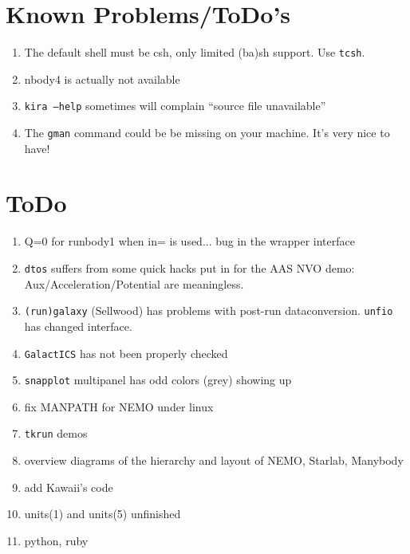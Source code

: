\section{Known Problems/ToDo's}
\begin{enumerate}

\item
The default shell must be csh, only limited (ba)sh support. Use {\tt tcsh}.

\item
nbody4 is actually not available

\item
{\tt kira --help} sometimes will complain ``source file unavailable''

\item
The {\tt gman} command could be be missing on your machine. It's very nice to have!

\end{enumerate}

\section{ToDo}
\begin{enumerate}

\item
Q=0 for runbody1 when in= is used...   bug in the wrapper interface

\item
{\tt dtos} suffers from some quick hacks put in for the AAS NVO demo:
Aux/Acceleration/Potential are meaningless.

\item
{\tt (run)galaxy} (Sellwood) has problems with post-run dataconversion. 
{\tt unfio} has changed interface.

\item
{\tt GalactICS} has not been properly checked 

\item
{\tt snapplot} multipanel has odd colors (grey) showing up

\item
fix MANPATH for NEMO under linux

\item
{\tt tkrun} demos

\item
overview diagrams of the hierarchy and layout of NEMO, Starlab, Manybody

\item
add Kawaii's code

\item
units(1) and units(5) unfinished

\item
python, ruby

\end{enumerate}

